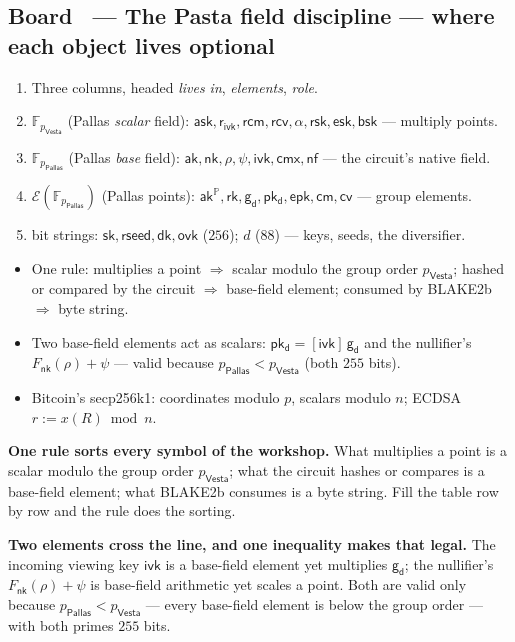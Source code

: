 \documentclass[11pt,a4paper]{article}
\makeatletter
\newcommand{\F}{\mathbb{F}}
\newcommand{\Ep}{\ensuremath{\mathcal{E}}}
\newcommand{\Pallas}{\ensuremath{\mathsf{Pallas}}}
\newcommand{\Vesta}{\ensuremath{\mathsf{Vesta}}}
\newcommand{\Fpp}{\ensuremath{\F_{p_{\Pallas}}}}
\newcommand{\Fpv}{\ensuremath{\F_{p_{\Vesta}}}}
\newcommand{\nfsym}{\ensuremath{\mathsf{nf}}}
\newcommand{\cmsym}{\ensuremath{\mathsf{cm}}}
\newcommand{\cmx}{\ensuremath{\mathsf{cmx}}}
\newcommand{\cvsym}{\ensuremath{\mathsf{cv}}}
\newcommand{\rksym}{\ensuremath{\mathsf{rk}}}
\newcommand{\gd}{\ensuremath{\mathsf{g_d}}}
\newcommand{\pkd}{\ensuremath{\mathsf{pk_d}}}
\newcommand{\aksym}{\ensuremath{\mathsf{ak}}}
\newcommand{\nksym}{\ensuremath{\mathsf{nk}}}
\newcommand{\asksym}{\ensuremath{\mathsf{ask}}}
\newcommand{\ivk}{\ensuremath{\mathsf{ivk}}}
\newcommand{\ovk}{\ensuremath{\mathsf{ovk}}}
\newcommand{\dk}{\ensuremath{\mathsf{dk}}}
\newcommand{\rcm}{\ensuremath{\mathsf{rcm}}}
\newcommand{\rcv}{\ensuremath{\mathsf{rcv}}}
\newcommand{\rivk}{\ensuremath{\mathsf{r_{ivk}}}}
\newcommand{\rsk}{\ensuremath{\mathsf{rsk}}}
\newcommand{\esk}{\ensuremath{\mathsf{esk}}}
\newcommand{\epk}{\ensuremath{\mathsf{epk}}}
\newcounter{board}
\newenvironment{board}[2]{\stepcounter{board}%
  \subsection*{Board \theboard\ --- #1 \hfill {\normalfont\small\color{arb}#2}}}{\medskip}
\newcommand{\Draw}{\draw@head{Draw}}
\newcommand{\Write}{\draw@head{Write}}
\newcommand{\Say}{\draw@head{Say}}
\makeatother
\begin{document}
\begin{board}{The Pasta field discipline --- where each object
  lives}{optional}
\Draw
\begin{enumerate}
  \item Three columns, headed \emph{lives in}, \emph{elements},
    \emph{role}.
  \item \Fpv{} (Pallas \emph{scalar} field): $\asksym, \rivk, \rcm,
    \rcv, \alpha, \rsk, \esk, \mathsf{bsk}$ --- multiply points.
  \item \Fpp{} (Pallas \emph{base} field): $\aksym, \nksym, \rho, \psi,
    \ivk, \cmx, \nfsym$ --- the circuit's native field.
  \item $\Ep(\Fpp)$ (Pallas points): $\aksym^{\mathbb{P}}, \rksym, \gd,
    \pkd, \epk, \cmsym, \cvsym$ --- group elements.
  \item bit strings: $\mathsf{sk}, \mathsf{rseed}, \dk, \ovk$ ($256$);
    $d$ ($88$) --- keys, seeds, the diversifier.
\end{enumerate}
\Write
\begin{itemize}
  \item One rule: multiplies a point $\Rightarrow$ scalar modulo the
    group order $p_{\Vesta}$; hashed or compared by the circuit
    $\Rightarrow$ base-field element; consumed by BLAKE2b $\Rightarrow$
    byte string.
  \item Two base-field elements act as scalars: $\pkd = [\ivk]\,\gd$
    and the nullifier's $F_{\nksym}(\rho) + \psi$ --- valid because
    $p_{\Pallas} < p_{\Vesta}$ (both $255$ bits).
  \item Bitcoin's secp256k1: coordinates modulo $p$, scalars modulo $n$;
    ECDSA $r := x(R) \bmod n$.
\end{itemize}
\Say
\textbf{One rule sorts every symbol of the workshop.} What multiplies a
point is a scalar modulo the group order $p_{\Vesta}$; what the circuit
hashes or compares is a base-field element; what BLAKE2b consumes is a
byte string. Fill the table row by row and the rule does the sorting.

\textbf{Two elements cross the line, and one inequality makes that
legal.} The incoming viewing key $\ivk$ is a base-field element yet
multiplies $\gd$; the nullifier's $F_{\nksym}(\rho) + \psi$ is base-field
arithmetic yet scales a point. Both are valid only because $p_{\Pallas}
< p_{\Vesta}$ --- every base-field element is below the group order ---
with both primes $255$ bits.


\end{board}
\end{document}
